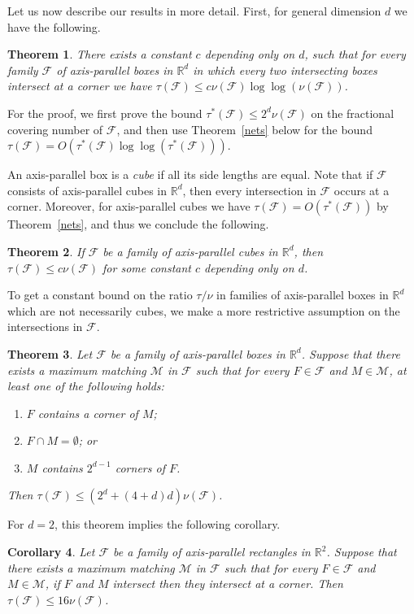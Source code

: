 \documentclass[12pt]{amsart}
\theoremstyle{plain}
\newtheorem{theorem}{Theorem}[section]
\newtheorem{corollary}[theorem]{Corollary}
\theoremstyle{definition}
\theoremstyle{remark}
\newcommand{\F}{\mathcal{F}}
\newcommand{\M}{\mathcal{M}}
\newcommand{\R}{\mathbb{R}}
\begin{document}
Let us now describe our results in more detail. First, for general dimension $d$ we have the following. 

\begin{theorem}\label{dloglog}
There exists a constant $c$ depending only on $d$, such that for every family $\F$ of axis-parallel boxes in $\R^d$ in which every two intersecting boxes intersect at a corner we have $\tau(\F) \leq  c\nu(\F)\log\log(\nu(\F))$. 
\end{theorem} 

For the proof, we first prove the bound  $\tau^*(\F) \leq  2^d\nu(\F)$ on the fractional covering number of $\F$, and then use Theorem~\ref{nets} below for the bound $\tau(\F) = O(\tau^*(\F)\log\log(\tau^*(\F)))$. 

An axis-parallel box is a \emph{cube} if all its side lengths are equal. Note that if $\F$ consists of axis-parallel cubes in $\R^d$, then every intersection in $\F$ occurs at a corner. Moreover, for axis-parallel cubes we have $\tau(\F) = O(\tau^*(\F))$ by Theorem~\ref{nets}, and thus we conclude the following.

\begin{theorem}\label{dloglogsquares}
If $\F$ be a family of axis-parallel cubes in $\R^d$, then $\tau(\F) \leq  c\nu(\F)$ for some constant $c$ depending only on $d$. 
\end{theorem}

To get a constant bound on the ratio $\tau/\nu$ in families of axis-parallel boxes in $\R^d$ which are not necessarily cubes, we make a more restrictive assumption on the intersections in $\F$. 

\begin{theorem}\label{mainthm1}
Let $\F$ be a family of axis-parallel boxes in $\R^d$. Suppose that there exists a maximum matching $\M$ in $\F$ such that for every $F\in \F$ and $M\in \M$, at least one of the following holds: 
\begin{enumerate}
\item $F$ contains a corner of $M$; 
\item $F \cap M = \emptyset$;  or
\item $M$ contains $2^{d-1}$ corners of $F$. 
\end{enumerate}
Then $\tau(\F) \leq (2^d+(4+d)d) \nu(\F)$. 
\end{theorem}

For $d=2$, this theorem implies the following corollary.  
\begin{corollary}\label{cor1}
Let $\F$ be a family of axis-parallel rectangles in $\R^2$. Suppose that there exists a maximum matching $\M$ in $\F$ such that for every $F\in \F$ and $M\in \M$, if $F$ and $M$ intersect then they intersect at a corner. 
Then $\tau(\F) \leq 16\nu(\F)$.
\end{corollary}
\end{document}
